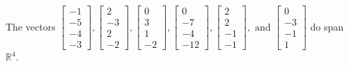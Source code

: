 \begin{exercise}
\begin{exerciseStatement}
  \end{exerciseStatement}
  \begin{exerciseAnswer}
   The vectors \(\left[\begin{array}{r}
-1 \\
-5 \\
-4 \\
-3
\end{array}\right] , \left[\begin{array}{r}
2 \\
-3 \\
2 \\
-2
\end{array}\right] , \left[\begin{array}{r}
0 \\
3 \\
1 \\
-2
\end{array}\right] , \left[\begin{array}{r}
0 \\
-7 \\
-4 \\
-12
\end{array}\right] , \left[\begin{array}{r}
2 \\
2 \\
-1 \\
-1
\end{array}\right] , \text{ and } \left[\begin{array}{r}
0 \\
-3 \\
-1 \\
1
\end{array}\right]\) 
  	 do  
	span \(\mathbb{R}^4\).
  


  \end{exerciseAnswer}
\end{exercise}